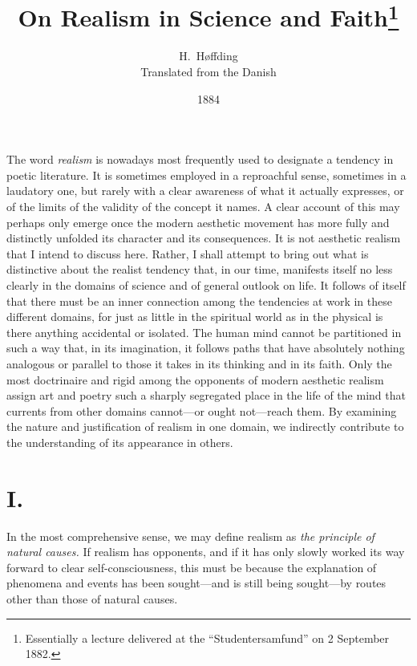 \documentclass[12pt,a4paper]{article}
\title{\textbf{On Realism in Science and Faith}\footnote{Essentially a
lecture delivered at the ``Studentersamfund'' on 2 September 1882.}}
\author{H.\ Høffding\\[4pt]
  \small Translated from the Danish}
\date{1884}
\newcommand{\opage}[1]{\marginnote{\footnotesize\textit{[#1]}}}
\begin{document}
\maketitle
\thispagestyle{fancy}

\bigskip

\opage{1}The word \emph{realism} is nowadays most frequently used to designate a
tendency in poetic literature. It is sometimes employed in a reproachful
sense, sometimes in a laudatory one, but rarely with a clear awareness of
what it actually expresses, or of the limits of the validity of the concept
it names. A clear account of this may perhaps only emerge once the modern
aesthetic movement has more fully and distinctly unfolded its character
and its consequences. It is not aesthetic realism that I intend to discuss
here. Rather, I shall attempt to bring out what is distinctive about the
realist tendency that, in our time, manifests itself no less clearly in
the domains of science and of general outlook on life. It follows of itself
that there must be an inner connection among the tendencies at work in
these different domains, for just as little in the spiritual world as in
the physical is there anything accidental or isolated. The human mind
cannot be partitioned in such a way that, in its imagination, it follows
paths that have absolutely nothing analogous or parallel to those it takes
in its thinking and in its faith. Only the most doctrinaire and rigid among
the opponents of modern aesthetic realism assign art and poetry such a
sharply segregated place in the life of the mind that currents from other
domains cannot---or ought not---reach them. By examining the nature and
justification of realism in one domain, we indirectly contribute to the
understanding of its appearance in others.

\section*{I.}

\opage{2}In the most comprehensive sense, we may define realism as \emph{the principle of natural causes.} If realism has opponents, and if it has only slowly
worked its way forward to clear self-consciousness, this must be because
the explanation of phenomena and events has been sought---and is still
being sought---by routes other than those of natural causes.
\end{document}

